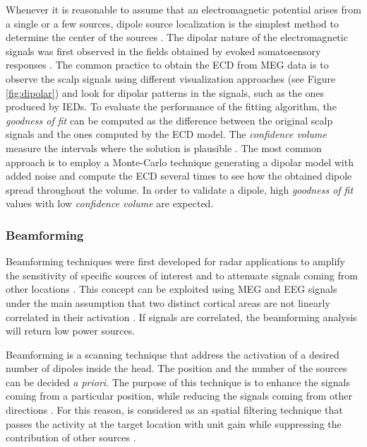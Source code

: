Whenever it is reasonable to assume that an electromagnetic potential arises from a single or a few sources, dipole source localization is the simplest method to determine the center of the sources \citep{Lutkenhoner1998}. The dipolar nature of the electromagnetic signals was first observed in the fields obtained by evoked somatosensory responses \citep{Barnard1967}. The common practice to obtain the ECD from MEG data is to observe the scalp signals using different visualization approaches (see Figure \ref{fig:dipolar}) and look for dipolar patterns in the signals, such as the ones produced by IEDs. To evaluate the performance of the fitting algorithm, the \emph{goodness of fit} can be computed as the difference between the original scalp signals and the ones computed by the ECD model. The \emph{confidence volume} measure the intervals where the solution is plausible \citep{Heller2014}. The most common approach is to employ a Monte-Carlo technique generating a dipolar model with added noise and compute the ECD several times to see how the obtained dipole spread throughout the volume. In order to validate a dipole, high \emph{goodness of fit} values with low \emph{confidence volume} are expected. 

\subsubsection{Beamforming}
\label{sec:Bfanalysis}
Beamforming techniques were first developed for radar applications to amplify the sensitivity of specific sources of interest and to attenuate signals coming from other locations \citep{vanVeen1988}. This concept can be exploited using MEG and EEG signals under the main assumption that two distinct cortical areas are not linearly correlated in their activation \citep{vanVeen1997}. If signals are correlated, the beamforming analysis will return low power sources. 

Beamforming is a scanning technique that address the activation of a desired number of dipoles inside the head. The position and the number of the sources can be decided \textit{a priori}.  The purpose of this technique is to enhance the signals coming from a particular position, while reducing the signals coming from other directions \citep{Zhang2015}.  For this reason, is considered as an spatial filtering technique that passes the activity at the target location with unit gain while suppressing the contribution of other sources \citep{vanVeen1997}. 

